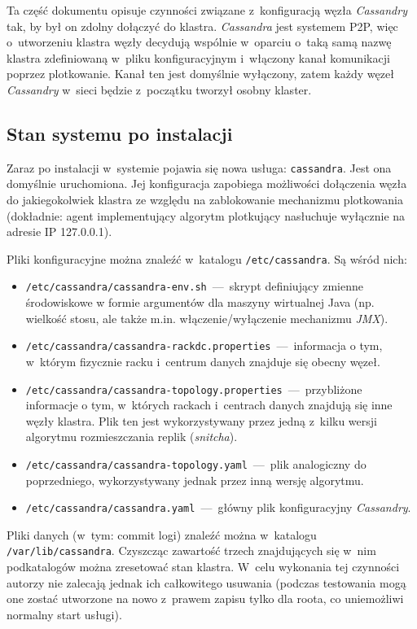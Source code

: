 \documentclass{article} %
\begin{document}
Ta część dokumentu opisuje czynności związane z~konfiguracją węzła \emph{Cassandry} tak, by był on zdolny dołączyć do klastra.
\emph{Cassandra} jest systemem P2P, więc o~utworzeniu klastra węzły decydują wspólnie w~oparciu o~taką samą nazwę klastra zdefiniowaną w~pliku konfiguracyjnym i~włączony kanał komunikacji poprzez plotkowanie.
Kanał ten jest domyślnie wyłączony, zatem każdy węzeł \emph{Cassandry} w~sieci będzie z~początku tworzył osobny klaster.

\subsection{Stan systemu po instalacji}\label{subsec:config_postinst}

Zaraz po instalacji w~systemie pojawia się nowa usługa: \texttt{cassandra}.
Jest ona domyślnie uruchomiona.
Jej konfiguracja zapobiega możliwości dołączenia węzła do jakiegokolwiek klastra ze względu na zablokowanie mechanizmu plotkowania (dokładnie: agent implementujący algorytm plotkujący nasłuchuje wyłącznie na adresie IP 127.0.0.1).

Pliki konfiguracyjne można znaleźć w~katalogu \texttt{/etc/cassandra}.
Są wśród nich:

\begin{itemize}
\item \texttt{/etc/cassandra/cassandra-env.sh}~---~skrypt definiujący zmienne środowiskowe w formie argumentów dla maszyny wirtualnej Java (np. wielkość stosu, ale także m.in. włączenie/wyłączenie mechanizmu \emph{JMX}).
\item \texttt{/etc/cassandra/cassandra-rackdc.properties}~---~informacja o tym, w~którym fizycznie racku i~centrum danych znajduje się obecny węzeł.
\item \texttt{/etc/cassandra/cassandra-topology.properties}~---~przybliżone informacje o tym, w~których rackach i~centrach danych znajdują się inne węzły klastra. Plik ten jest wykorzystywany przez jedną z~kilku wersji algorytmu rozmieszczania replik (\emph{snitcha}).
\item \texttt{/etc/cassandra/cassandra-topology.yaml}~---~plik analogiczny do poprzedniego, wykorzystywany jednak przez inną wersję algorytmu.
\item \texttt{/etc/cassandra/cassandra.yaml}~---~główny plik konfiguracyjny \emph{Cassandry}.
\end{itemize}

Pliki danych (w~tym: commit logi) znaleźć można w~katalogu \texttt{/var/lib/cassandra}.
Czyszcząc zawartość trzech znajdujących się w~nim podkatalogów można zresetować stan klastra.
W~celu wykonania tej czynności autorzy nie zalecają jednak ich całkowitego usuwania (podczas testowania mogą one zostać utworzone na nowo z~prawem zapisu tylko dla roota, co uniemożliwi normalny start usługi).
\end{document}
